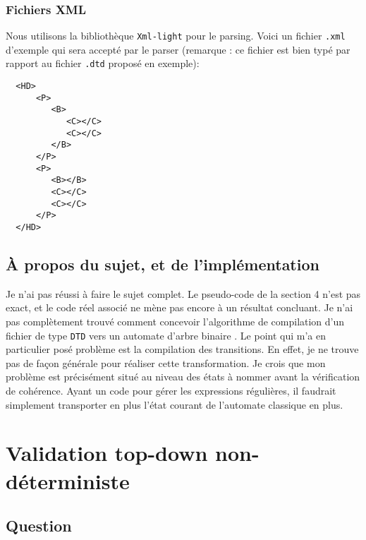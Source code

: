 \documentclass[twoside,12pt]{article}
\begin{document}
\subsubsection{Fichiers XML}

Nous utilisons la bibliothèque \texttt{Xml-light} pour le parsing.
Voici un fichier \texttt{.xml} d'exemple qui sera accepté par le parser (remarque :
ce fichier est bien typé par rapport au fichier \texttt{.dtd} proposé en exemple):
  \begin{verbatim}
  <HD>
      <P>
         <B>
            <C></C>
            <C></C>
         </B>
      </P>
      <P>
         <B></B>
         <C></C>
         <C></C>
      </P>
  </HD>
  \end{verbatim}

\subsection{À propos du sujet, et de l'implémentation}

Je n'ai pas réussi à faire le sujet complet.
Le pseudo-code de la section 4 n'est pas exact, et
le code réel associé ne mène pas encore à un résultat concluant.
Je n'ai pas complètement trouvé comment concevoir l'algorithme de
compilation d'un fichier de type \texttt{DTD} vers un automate
d'arbre binaire \footnotemark. Le point qui m'a en particulier posé
problème est la compilation des transitions. En effet, je ne trouve
pas de façon générale pour réaliser cette transformation. Je crois
que mon problème est précisément situé au niveau des états à nommer
avant la vérification de cohérence. Ayant un code pour gérer les
expressions régulières, il faudrait \og simplement \fg{} transporter
en plus l'état courant de l'automate classique en plus.



\section{Validation top-down non-déterministe}
\subsection{Question}
\end{document}
